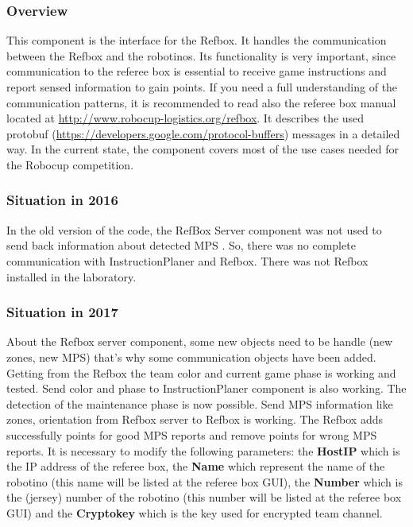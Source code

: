 
\subsubsection{Overview}

This component is the interface for the Refbox. It handles the communication between the Refbox and the robotinos. Its functionality is very important, since communication to the referee box is essential to receive game instructions and report sensed information to gain points. If you need a full understanding of the communication patterns, it is recommended to read also the referee box manual located at \url{ http://www.robocup-logistics.org/refbox}. It describes the used protobuf (\url{https://developers.google.com/protocol-buffers}) messages in a detailed way. In the current state, the component covers most of the use cases needed for the Robocup competition.


\subsubsection{Situation in 2016}

In the old version of the code, the RefBox Server component was not used to send back information about detected MPS \cite{BOK}. So, there was no complete communication with InstructionPlaner and Refbox. There was not Refbox installed in the laboratory. 


\subsubsection{Situation in 2017}

About the Refbox server component, some new objects need to be handle (new zones, new MPS) that's why some communication objects have been added. Getting from the Refbox the team color and current game phase is working and tested. Send color and phase to InstructionPlaner component is also working. The detection of the maintenance phase is now possible. Send MPS information like zones, orientation from Refbox server to Refbox is working. The Refbox adds successfully points for good MPS reports and remove points for wrong MPS reports. It is necessary to modify the following parameters: the \textbf{HostIP} which is the IP address of the referee box, the \textbf{Name} which represent the name of the robotino (this name will be listed at the referee box GUI), the \textbf{Number} which is the (jersey) number of the robotino (this number will be listed at the referee box GUI) and the \textbf{Cryptokey} which is the key used for encrypted team channel.\\

